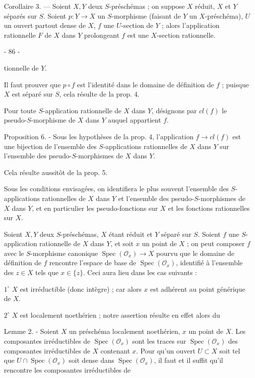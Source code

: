 Corollaire 3. — Soient $X, Y$ deux $S$-préschémas ; on suppose $X$ réduit, $X$ et $Y$ séparés sur $S$. Soient $p : Y \to X$ un $S$-morphisme (faisant de $Y$ un $X$-préschéma), $U$ un ouvert partout dense de $X$, $f$ une $U$-section de $Y$ ; alors l'application rationnelle $F$ de $X$ dans $Y$ prolongeant $f$ est une $X$-section rationnelle.

\newpage


- 86 -

tionnelle de $Y$.

Il faut prouver que $p \circ f$ est l'identité dans le domaine de définition de $f$ ; puisque $X$ est séparé sur $S$, cela résulte de la prop. 4.

Pour toute $S$-application rationnelle de $X$ dans $Y$, désignons par $cl(f)$ le pseudo-$S$-morphisme de $X$ dans $Y$ auquel appartient $f$.

Proposition 6. - Sous les hypothèses de la prop. 4, l'application $f \to cl(f)$ est une bijection de l'ensemble des $S$-applications rationnelles de $X$ dans $Y$ sur l'ensemble des pseudo-$S$-morphismes de $X$ dans $Y$.

Cela résulte aussitôt de la prop. 5.

Sous les conditions envisagées, on identifiera le plus souvent l'ensemble des $S$-applications rationnelles de $X$ dans $Y$ et l'ensemble des pseudo-$S$-morphismes de $X$ dans $Y$, et en particulier les pseudo-fonctions sur $X$ et les fonctions rationnelles sur $X$.

Soient $X, Y$ deux $S$-préschémas, $X$ étant réduit et $Y$ séparé sur $S$. Soient $f$ une $S$-application rationnelle de $X$ dans $Y$, et soit $x$ un point de $X$ ; on peut composer $f$ avec le $S$-morphisme canonique $\operatorname{Spec}(\mathcal{O}_x) \to X$ pourvu que le domaine de définition de $f$ rencontre l'espace de base de $\operatorname{Spec}(\mathcal{O}_x)$, identifié à l'ensemble des $z \in X$ tels que $x \in \{z\}$. Ceci aura lieu dans les cas suivants :

$1^\circ$ $X$ est irréductible (donc intègre) ; car alors $x$ est adhérent au point générique de $X$.

$2^\circ$ $X$ est localement noethérien ; notre assertion résulte en effet alors du

Lemme 2. - Soient $X$ un préschéma localement noethérien, $x$ un point de $X$. Les composantes irréductibles de $\operatorname{Spec}(\mathcal{O}_x)$ sont les traces sur $\operatorname{Spec}(\mathcal{O}_x)$ des composantes irréductibles de $X$ contenant $x$. Pour qu'un ouvert $U \subset X$ soit tel que $U \cap \operatorname{Spec}(\mathcal{O}_x)$ soit dense dans $\operatorname{Spec}(\mathcal{O}_x)$, il faut et il suffit qu'il rencontre les composantes irréductibles de

